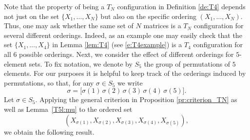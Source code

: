 \documentclass[titlepage]{amsart}
\numberwithin{equation}{section}
\theoremstyle{plain}
\theoremstyle{definition}
\theoremstyle{remark}
\begin{document}
Note that the property of being a $T_N$ configuration in Definition \ref{de:T4} depends not just on the set $\{X_1,\dots,X_N\}$ but also on the specific ordering $(X_1,\dots,X_N)$. Thus, one may ask whether the same set of $N$ matrices is a $T_N$ configuration for several different orderings. Indeed, as an example one may easily check that the set $\{X_1,\dots,X_4\}$ in Lemma \ref{lem:T4} (see \eqref{e:T4example}) is a $T_4$ configuration for all $6$ possible orderings. 
Next, we consider the effect of different orderings for $5$-element sets. To fix notation, we denote by $S_5$ the group of permutations of $5$ elements. For our purposes it is helpful to keep track of the orderings induced by permutations, so that, for any $\sigma\in S_5$ we write 
$$
\sigma=\bigl[\sigma(1)\,\sigma(2)\,\sigma(3)\,\sigma(4)\,\sigma(5)\bigr].
$$
Let $\sigma\in S_5$. Applying the general criterion in Proposition \ref{pr:criterion_TN} as well as Lemma~\ref{T5l:mu} to the ordered set 
$$
\left(X_{\sigma(1)},X_{\sigma(2)},X_{\sigma(3)},X_{\sigma(4)},X_{\sigma(5)}\right),
$$  we obtain the following result.
\end{document}
